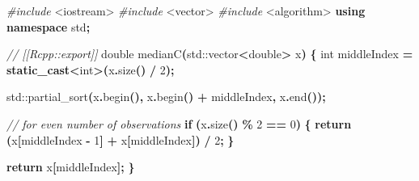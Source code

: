 \documentclass[
]{book}
\newenvironment{Shaded}{\begin{snugshade}}{\end{snugshade}}
\newcommand{\BuiltInTok}[1]{#1}
\newcommand{\CommentTok}[1]{\textcolor[rgb]{0.56,0.35,0.01}{\textit{#1}}}
\newcommand{\ControlFlowTok}[1]{\textcolor[rgb]{0.13,0.29,0.53}{\textbf{#1}}}
\newcommand{\DataTypeTok}[1]{\textcolor[rgb]{0.13,0.29,0.53}{#1}}
\newcommand{\DecValTok}[1]{\textcolor[rgb]{0.00,0.00,0.81}{#1}}
\newcommand{\ImportTok}[1]{#1}
\newcommand{\KeywordTok}[1]{\textcolor[rgb]{0.13,0.29,0.53}{\textbf{#1}}}
\newcommand{\NormalTok}[1]{#1}
\newcommand{\OperatorTok}[1]{\textcolor[rgb]{0.81,0.36,0.00}{\textbf{#1}}}
\newcommand{\PreprocessorTok}[1]{\textcolor[rgb]{0.56,0.35,0.01}{\textit{#1}}}
\begin{document}
\begin{Shaded}
\begin{Highlighting}[]
\PreprocessorTok{\#include }\ImportTok{\textless{}iostream\textgreater{}}
\PreprocessorTok{\#include }\ImportTok{\textless{}vector\textgreater{}}
\PreprocessorTok{\#include }\ImportTok{\textless{}algorithm\textgreater{}}
\KeywordTok{using} \KeywordTok{namespace}\NormalTok{ std}\OperatorTok{;}

\CommentTok{// [[Rcpp::export]]}
\DataTypeTok{double}\NormalTok{ medianC}\OperatorTok{(}\BuiltInTok{std::}\NormalTok{vector}\OperatorTok{\textless{}}\DataTypeTok{double}\OperatorTok{\textgreater{}}\NormalTok{ x}\OperatorTok{)}
\OperatorTok{\{}
    \DataTypeTok{int}\NormalTok{ middleIndex }\OperatorTok{=} \KeywordTok{static\_cast}\OperatorTok{\textless{}}\DataTypeTok{int}\OperatorTok{\textgreater{}(}\NormalTok{x}\OperatorTok{.}\NormalTok{size}\OperatorTok{()} \OperatorTok{/} \DecValTok{2}\OperatorTok{);}

    \BuiltInTok{std::}\NormalTok{partial\_sort}\OperatorTok{(}\NormalTok{x}\OperatorTok{.}\NormalTok{begin}\OperatorTok{(),}\NormalTok{ x}\OperatorTok{.}\NormalTok{begin}\OperatorTok{()} \OperatorTok{+}\NormalTok{ middleIndex}\OperatorTok{,}\NormalTok{ x}\OperatorTok{.}\NormalTok{end}\OperatorTok{());}

    \CommentTok{// for even number of observations}
    \ControlFlowTok{if} \OperatorTok{(}\NormalTok{x}\OperatorTok{.}\NormalTok{size}\OperatorTok{()} \OperatorTok{\%} \DecValTok{2} \OperatorTok{==} \DecValTok{0}\OperatorTok{)}
    \OperatorTok{\{}
        \ControlFlowTok{return} \OperatorTok{(}\NormalTok{x}\OperatorTok{[}\NormalTok{middleIndex }\OperatorTok{{-}} \DecValTok{1}\OperatorTok{]} \OperatorTok{+}\NormalTok{ x}\OperatorTok{[}\NormalTok{middleIndex}\OperatorTok{])} \OperatorTok{/} \DecValTok{2}\OperatorTok{;}
    \OperatorTok{\}}

    \ControlFlowTok{return}\NormalTok{ x}\OperatorTok{[}\NormalTok{middleIndex}\OperatorTok{];}
\OperatorTok{\}}
\end{Highlighting}
\end{Shaded}
\end{document}
